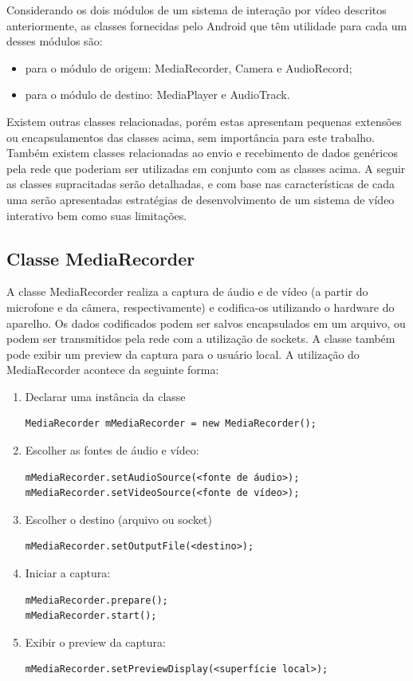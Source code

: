 \documentclass{acm_proc_article-sp}
\begin{document}
Considerando os dois módulos de um sistema de interação por vídeo descritos anteriormente, as classes fornecidas pelo Android que têm utilidade para cada um desses módulos são:
\begin{itemize}
 \item para o módulo de origem: MediaRecorder, Camera e AudioRecord;
 \item para o módulo de destino: MediaPlayer e AudioTrack.
\end{itemize}

Existem outras classes relacionadas, porém estas apresentam pequenas extensões ou encapsulamentos das classes acima, sem importância para este trabalho. Também existem classes relacionadas ao envio e recebimento de dados genéricos pela rede que poderiam ser utilizadas em conjunto com as classes acima. A seguir as classes supracitadas serão detalhadas, e com base nas características de cada uma serão apresentadas estratégias de desenvolvimento de um sistema de vídeo interativo bem como suas limitações.

\subsection{Classe MediaRecorder}
A classe MediaRecorder realiza a captura de áudio e de vídeo (a partir do microfone e da câmera, respectivamente) e codifica-os utilizando o hardware do aparelho. Os dados codificados podem ser salvos encapsulados em um arquivo, ou podem ser transmitidos pela rede com a utilização de sockets. A classe também pode exibir um preview da captura para o usuário local. A utilização do MediaRecorder acontece da seguinte forma:
\begin{enumerate}
 \item Declarar uma instância da classe
  \begin{verbatim}
MediaRecorder mMediaRecorder = new MediaRecorder();
  \end{verbatim}
 \item Escolher as fontes de áudio e vídeo:
  \begin{verbatim}
mMediaRecorder.setAudioSource(<fonte de áudio>);
mMediaRecorder.setVideoSource(<fonte de vídeo>);
  \end{verbatim}
 \item Escolher o destino (arquivo ou socket)
  \begin{verbatim}
mMediaRecorder.setOutputFile(<destino>);
  \end{verbatim}
 \item Iniciar a captura:
  \begin{verbatim}
mMediaRecorder.prepare();
mMediaRecorder.start();
  \end{verbatim}
 \item Exibir o preview da captura:
  \begin{verbatim}
mMediaRecorder.setPreviewDisplay(<superfície local>);
  \end{verbatim}
\end{enumerate}
\end{document}
